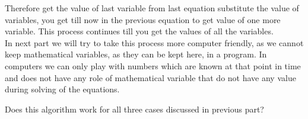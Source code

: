 \documentclass{article}
\begin{document}
Therefore get the value of last variable from last equation substitute the value of variables, you get till now in the previous equation to get value of one more variable. This process continues till you get the values of all the variables.\\

In next part we will try to take this process more computer friendly, as we cannot keep mathematical variables, as they can be kept here, in a program. In computers we can only play with numbers which are known at that point in time and does not have any role of mathematical variable that do not have any value during solving of the equations.

Does this algorithm work for all three cases discussed in previous part?
\end{document}
